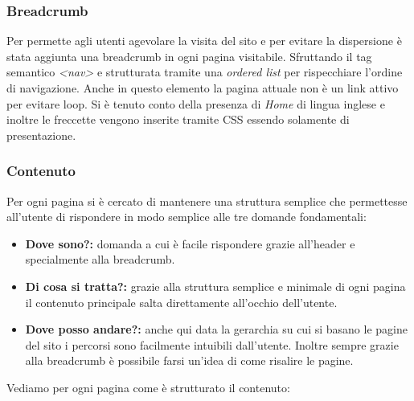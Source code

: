 \subsubsection{Breadcrumb}
Per permette agli utenti agevolare la visita del sito e per evitare la dispersione è stata aggiunta una breadcrumb in ogni pagina visitabile. Sfruttando il tag semantico \textit{<nav>} e strutturata tramite una \textit{ordered list} per rispecchiare l'ordine di navigazione. Anche in questo elemento la pagina attuale non è un link attivo per evitare loop. Si è tenuto conto della presenza di \textit{Home} di lingua inglese e inoltre le freccette vengono inserite tramite CSS essendo solamente di presentazione.

\subsubsection{Contenuto}
Per ogni pagina si è cercato di mantenere una struttura semplice che permettesse all'utente di rispondere in modo semplice alle tre domande fondamentali:
    \begin{itemize}
        \item \textbf{Dove sono?:} domanda a cui è facile rispondere grazie all'header e specialmente alla breadcrumb.
        \item \textbf{Di cosa si tratta?:} grazie alla struttura semplice e minimale di ogni pagina il contenuto principale salta direttamente all'occhio dell'utente.
        \item \textbf{Dove posso andare?:} anche qui data la gerarchia su cui si basano le pagine del sito i percorsi sono facilmente intuibili dall'utente. Inoltre sempre grazie alla breadcrumb è possibile farsi un'idea di come risalire le pagine.
    \end{itemize}
Vediamo per ogni pagina come è strutturato il contenuto:
